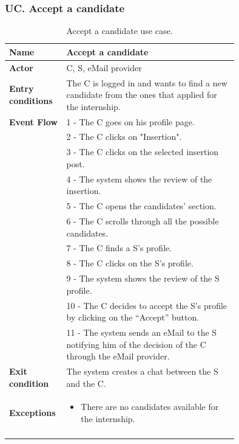 \subsubsection*{UC\cuc . Accept a candidate}
\begin{center}
    \begin{longtable}{|l|p{0.75\linewidth}|}
        \hline
        \textbf{Name}               & Accept a candidate\\
        \hline
        \textbf{Actor}              & C, S, eMail provider\\
        \hline
        \textbf{Entry conditions}   & The C is logged in and wants to find a new candidate from the ones that applied for the internship.\\
        \hline
        \textbf{Event Flow}         & 1 - The C goes on his profile page. \\
        & 2 - The C clicks on "Insertion". \\
        & 3 - The C clicks on the selected insertion post. \\
        & 4 - The system shows the review of the insertion. \\
        & 5 - The C opens the candidates’ section. \\
        & 6 - The C scrolls through all the possible candidates. \\
        & 7 - The C finds a S’s profile. \\
        & 8 - The C clicks on the S’s profile. \\
        & 9 - The system shows the review of the S profile. \\
        & 10 - The C decides to accept the S’s profile by clicking on the “Accept” button. \\
        & 11 - The system sends an eMail to the S notifying him of the decision of the C through the eMail provider. \\
        \hline
        \textbf{Exit condition}   & The system creates a chat between the S and the C. \\       
        \hline
        \textbf{Exceptions}       & \begin{itemize}
            \item There are no candidates available for the internship.
        \end{itemize}\\
        \hline
        \caption{Accept a candidate use case.}
        \label{tab: accept_a_candidate_use_case}
    \end{longtable}
\end{center}


